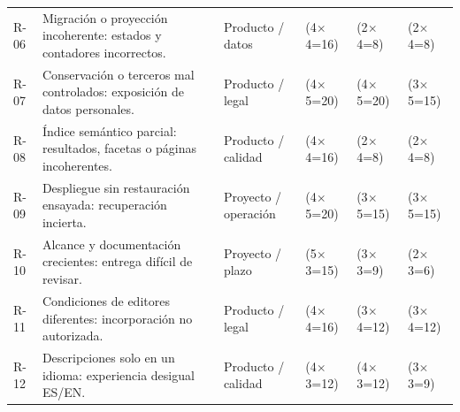 {\begin{longtable}{p{}p{}p{}p{}p{}p{}}
		R-06        & Migración o proyección incoherente: estados y contadores incorrectos.    & Producto / datos     & (4\ensuremath{\times}4=16) & (2\ensuremath{\times}4=8)  & (2\ensuremath{\times}4=8)  \\
		R-07        & Conservación o terceros mal controlados: exposición de datos personales. & Producto / legal     & (4\ensuremath{\times}5=20) & (4\ensuremath{\times}5=20) & (3\ensuremath{\times}5=15) \\
		R-08        & Índice semántico parcial: resultados, facetas o páginas incoherentes.    & Producto / calidad   & (4\ensuremath{\times}4=16) & (2\ensuremath{\times}4=8)  & (2\ensuremath{\times}4=8)  \\
		R-09        & Despliegue sin restauración ensayada: recuperación incierta.             & Proyecto / operación & (4\ensuremath{\times}5=20) & (3\ensuremath{\times}5=15) & (3\ensuremath{\times}5=15) \\
		R-10        & Alcance y documentación crecientes: entrega difícil de revisar.          & Proyecto / plazo     & (5\ensuremath{\times}3=15) & (3\ensuremath{\times}3=9)  & (2\ensuremath{\times}3=6)  \\
		R-11        & Condiciones de editores diferentes: incorporación no autorizada.         & Producto / legal     & (4\ensuremath{\times}4=16) & (3\ensuremath{\times}4=12) & (3\ensuremath{\times}4=12) \\
		R-12        & Descripciones solo en un idioma: experiencia desigual ES/EN.             & Producto / calidad   & (4\ensuremath{\times}3=12) & (4\ensuremath{\times}3=12) & (3\ensuremath{\times}3=9)  \\
		\bottomrule
	\end{longtable}
}

